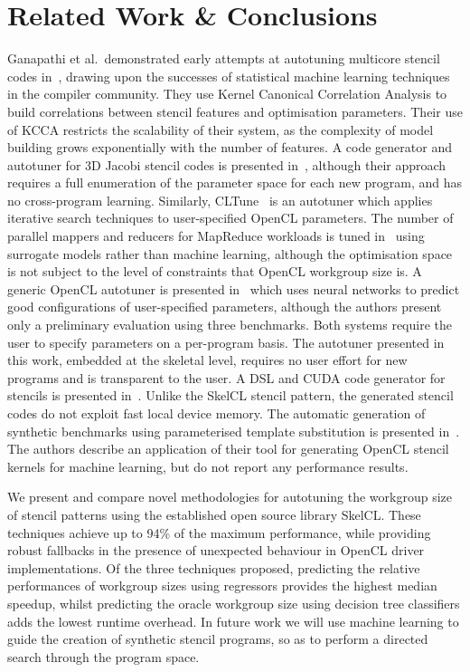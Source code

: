\documentclass{acaces}
\begin{document}
\section{Related Work \& Conclusions}\label{sec:related}

Ganapathi et al.\ demonstrated early attempts at autotuning multicore
stencil codes in~\cite{Ganapathi2009}, drawing upon the successes of
statistical machine learning techniques in the compiler
community. They use Kernel Canonical Correlation Analysis to build
correlations between stencil features and optimisation
parameters. Their use of KCCA restricts the scalability of their
system, as the complexity of model building grows exponentially with
the number of features. A code generator and autotuner for 3D Jacobi
stencil codes is presented in~\cite{Zhang2013a}, although their
approach requires a full enumeration of the parameter space for each
new program, and has no cross-program learning. Similarly,
CLTune~\cite{Nugteren2015} is an autotuner which applies iterative
search techniques to user-specified OpenCL parameters. The number of
parallel mappers and reducers for MapReduce workloads is tuned
in~\cite{Johnston2015a} using surrogate models rather than machine
learning, although the optimisation space is not subject to the level
of constraints that OpenCL workgroup size is. A generic OpenCL
autotuner is presented in~\cite{Falch2015} which uses neural networks
to predict good configurations of user-specified parameters, although
the authors present only a preliminary evaluation using three
benchmarks. Both systems require the user to specify parameters on a
per-program basis. The autotuner presented in this work, embedded at
the skeletal level, requires no user effort for new programs and is
transparent to the user. A DSL and CUDA code generator for stencils is
presented in~\cite{Kamil2010}. Unlike the SkelCL stencil pattern, the
generated stencil codes do not exploit fast local device memory. The
automatic generation of synthetic benchmarks using parameterised
template substitution is presented in~\cite{Chiu2015}. The authors
describe an application of their tool for generating OpenCL stencil
kernels for machine learning, but do not report any performance
results.



We present and compare novel methodologies for autotuning the
workgroup size of stencil patterns using the established open source
library SkelCL. These techniques achieve up to 94\% of the maximum
performance, while providing robust fallbacks in the presence of
unexpected behaviour in OpenCL driver implementations. Of the three
techniques proposed, predicting the relative performances of workgroup
sizes using regressors provides the highest median speedup, whilst
predicting the oracle workgroup size using decision tree classifiers
adds the lowest runtime overhead. In future work we will use machine
learning to guide the creation of synthetic stencil programs, so as to
perform a directed search through the program space.
\end{document}
